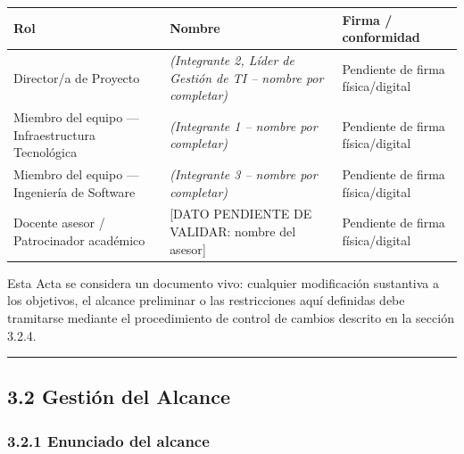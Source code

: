 \documentclass[11pt,a4paper]{article}
\begin{document}
{\small
\begin{longtable}[]{@{}
  >{\raggedright\arraybackslash}p{}
  >{\raggedright\arraybackslash}p{}
  >{\raggedright\arraybackslash}p{}@{}}
\toprule\noalign{}
\begin{minipage}[b]{\linewidth}\raggedright
Rol
\end{minipage} & \begin{minipage}[b]{\linewidth}\raggedright
Nombre
\end{minipage} & \begin{minipage}[b]{\linewidth}\raggedright
Firma / conformidad
\end{minipage} \\
\midrule\noalign{}
\endhead
\bottomrule\noalign{}
\endlastfoot
Director/a de Proyecto & \textit{(Integrante 2, Líder de Gestión de TI -- nombre por completar)} & Pendiente de firma física/digital \\
Miembro del equipo --- Infraestructura Tecnológica & \textit{(Integrante 1 -- nombre por completar)} & Pendiente de firma física/digital \\
Miembro del equipo --- Ingeniería de Software & \textit{(Integrante 3 -- nombre por completar)} & Pendiente de firma física/digital \\
Docente asesor / Patrocinador académico & {[}DATO PENDIENTE DE VALIDAR: nombre del asesor{]} & Pendiente de firma física/digital \\
\end{longtable}
}

Esta Acta se considera un documento vivo: cualquier modificación sustantiva a los objetivos, el alcance preliminar o las restricciones aquí definidas debe tramitarse mediante el procedimiento de control de cambios descrito en la sección 3.2.4.

\begin{center}\rule{0.5\linewidth}{0.5pt}\end{center}

\subsection{3.2 Gestión del Alcance}\label{gestiuxf3n-del-alcance}

\subsubsection{3.2.1 Enunciado del alcance}\label{enunciado-del-alcance}
\end{document}
